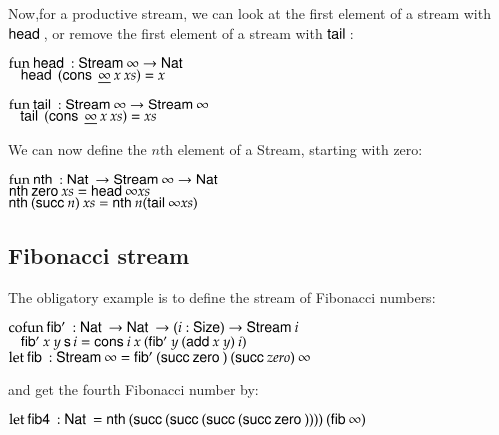 Now,for a productive stream, we can look at the first element of a stream with $\head$, or remove the first element of a stream with $\tail$:
\begin{bsp}
$\fun \head : \Stream \infty \ra \Nat$\\
$\spc \head \: (\cons \: \inacc{\infty} \: x \: xs) = x$

$\fun \tail :  \Stream \infty \ra \Stream \infty $\\
$\spc \tail \: (\cons \: \inacc{\infty} \: x \: xs) = xs$\\
\end{bsp}

We can now define the $n$th element of a Stream, starting with zero:
\begin{bsp}
$\fun \nth : \Nat \ra \Stream \infty \ra \Nat$\\
$\nth \zero xs = \head \infty xs$\\
$\nth (\suc n) \: xs = \nth n (\tail \infty xs)$\\
\end{bsp}
\subsection{Fibonacci stream}

The obligatory example is to define the stream of Fibonacci numbers:
\begin{bsp}
$\cofun \fibs : \Nat \ra \Nat \ra \EPi{i}{\Size}{\Stream i}$\\
$\spc  \fibs x \: y \: \s i = \cons i \: x \: (\fibs y \: (\add x \: y) \: i)$\\

$\clet \fib : \Stream \infty = \fibs (\suc \zero) \: (\suc zero) \: \infty$
\end{bsp}
and get the fourth Fibonacci number by:
\begin{bsp}
$\clet \fibf : \Nat = \nth (\suc (\suc (\suc (\suc \zero )))) \: (\fib \infty)$
\end{bsp}

